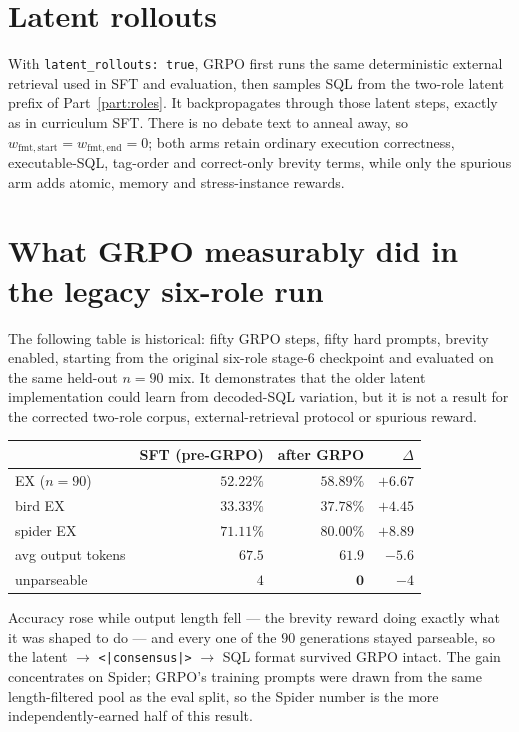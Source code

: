 \documentclass[11pt]{article}
\theoremstyle{definition}
\begin{document}
\section{Latent rollouts}

With \texttt{latent\_rollouts: true}, GRPO first runs the same deterministic external retrieval used in SFT and evaluation, then samples SQL from the two-role latent prefix of Part~\ref{part:roles}. It backpropagates through those latent steps, exactly as in curriculum SFT. There is no debate text to anneal away, so $w_{\mathrm{fmt},\text{start}}=w_{\mathrm{fmt},\text{end}}=0$; both arms retain ordinary execution correctness, executable-SQL, tag-order and correct-only brevity terms, while only the spurious arm adds atomic, memory and stress-instance rewards.

\section{What GRPO measurably did in the legacy six-role run}

The following table is historical: fifty GRPO steps, fifty hard prompts, brevity enabled, starting from the original six-role stage-$6$ checkpoint and evaluated on the same held-out $n=90$ mix. It demonstrates that the older latent implementation could learn from decoded-SQL variation, but it is not a result for the corrected two-role corpus, external-retrieval protocol or spurious reward.

\begin{center}
\begin{tabular}{lrrr}
\toprule
 & SFT (pre-GRPO) & after GRPO & $\Delta$ \\
\midrule
EX ($n=90$)         & $52.22\%$ & $\mathbf{58.89\%}$ & $+6.67$ \\
bird EX              & $33.33\%$ & $\mathbf{37.78\%}$ & $+4.45$ \\
spider EX            & $71.11\%$ & $\mathbf{80.00\%}$ & $+8.89$ \\
avg output tokens    & $67.5$    & $\mathbf{61.9}$     & $-5.6$ \\
unparseable          & $4$       & $\mathbf{0}$        & $-4$ \\
\bottomrule
\end{tabular}
\end{center}

Accuracy rose while output length fell — the brevity reward doing exactly what it was shaped to do — and every one of the $90$ generations stayed parseable, so the latent $\to$ \texttt{<|consensus|>} $\to$ SQL format survived GRPO intact. The gain concentrates on Spider; GRPO's training prompts were drawn from the same length-filtered pool as the eval split, so the Spider number is the more independently-earned half of this result.
\end{document}
